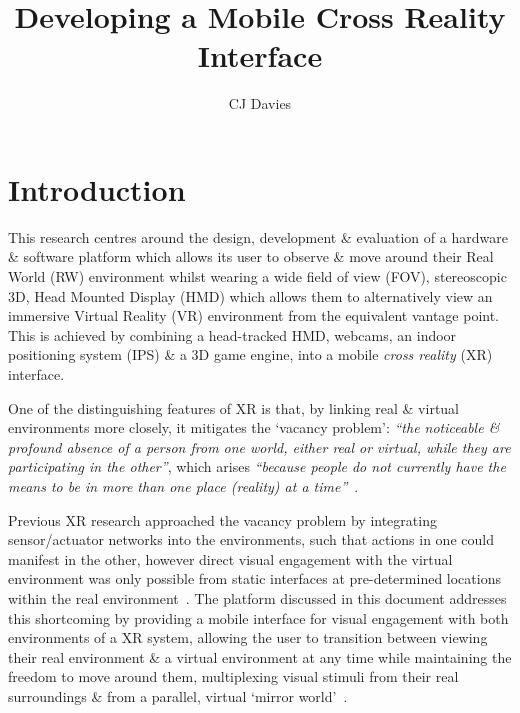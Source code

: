 \documentclass[oneside]{book}
\begin{document}
\title{Developing a Mobile Cross Reality Interface}
\author{CJ Davies}

\maketitle



\chapter{Introduction}
This research centres around the design, development \& evaluation of a hardware \& software platform which allows its user to observe \& move around their Real World (RW) environment whilst wearing a wide field of view (FOV), stereoscopic 3D, Head Mounted Display (HMD) which allows them to alternatively view an immersive Virtual Reality (VR) environment from the equivalent vantage point. This is achieved by combining a head-tracked HMD, webcams, an indoor positioning system (IPS) \& a 3D game engine, into a mobile \textit{cross reality} (XR) interface.

One of the distinguishing features of XR is that, by linking real \& virtual environments more closely, it mitigates the `vacancy problem': \textit{``the noticeable \& profound absence of a person from one world, either real or virtual, while they are participating in the other''}, which arises \textit{``because people do not currently have the means to be in more than one place (reality) at a time''}~\cite{Lifton2007a}.

Previous XR research approached the vacancy problem by integrating sensor/actuator networks into the environments, such that actions in one could manifest in the other, however direct visual engagement with the virtual environment was only possible from static interfaces at pre-determined locations within the real environment~\cite{Lifton2007a, Dublon2011}. The platform discussed in this document addresses this shortcoming by providing a mobile interface for visual engagement with both environments of a XR system, allowing the user to transition between viewing their real environment \& a virtual environment at any time while maintaining the freedom to move around them, multiplexing visual stimuli from their real surroundings \& from a parallel, virtual `mirror world'~\cite{Gelernter1993}.
\end{document}
